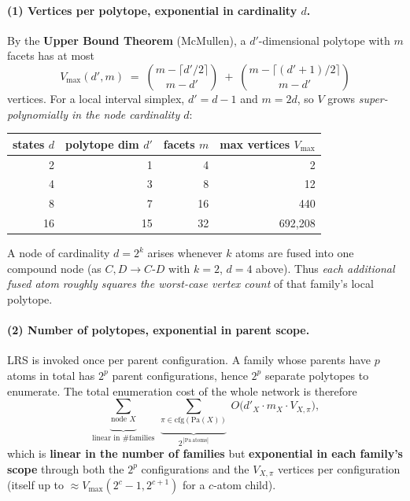 \documentclass[11pt]{article}
\begin{document}
\paragraph{(1) Vertices per polytope, exponential in cardinality $d$.}
By the \textbf{Upper Bound Theorem} (McMullen), a $d'$-dimensional polytope with $m$
facets has at most
\[
  V_{\max}(d', m) \;=\; \binom{m - \lceil d'/2\rceil}{m - d'}
    \;+\; \binom{m - \lceil (d'{+}1)/2\rceil}{m - d'}
\]
vertices. For a local interval simplex, $d' = d-1$ and $m = 2d$, so $V$ grows
\emph{super-polynomially in the node cardinality $d$}:
\begin{center}
\begin{tabular}{rrrr}
\toprule
states $d$ & polytope dim $d'$ & facets $m$ & max vertices $V_{\max}$ \\
\midrule
2  & 1  & 4  & 2 \\
4  & 3  & 8  & 12 \\
8  & 7  & 16 & 440 \\
16 & 15 & 32 & 692{,}208 \\
\bottomrule
\end{tabular}
\end{center}
A node of cardinality $d = 2^{k}$ arises whenever $k$ atoms are fused into one compound
node (as $C,D \to C\text{-}D$ with $k=2$, $d=4$ above). Thus \emph{each additional fused
atom roughly squares the worst-case vertex count} of that family's local polytope.

\paragraph{(2) Number of polytopes, exponential in parent scope.}
LRS is invoked once per parent configuration. A family whose parents have $p$ atoms in
total has $2^{p}$ parent configurations, hence $2^{p}$ separate polytopes to enumerate.
The total enumeration cost of the whole network is therefore
\begin{equation}
  \underbrace{\sum_{\text{node } X}}_{\text{linear in \#families}}\
  \underbrace{\sum_{\pi \in \mathrm{cfg}(\mathrm{Pa}(X))}}_{\;2^{\,|\mathrm{Pa\ atoms}|}\;}
  \ O\bigl(d'_X \cdot m_X \cdot V_{X,\pi}\bigr),
  \label{eq:total}
\end{equation}
which is \textbf{linear in the number of families} but \textbf{exponential in each
family's scope} through both the $2^{p}$ configurations and the $V_{X,\pi}$ vertices per
configuration (itself up to $\approx V_{\max}(2^{c}{-}1, 2^{c+1})$ for a $c$-atom child).
\end{document}
